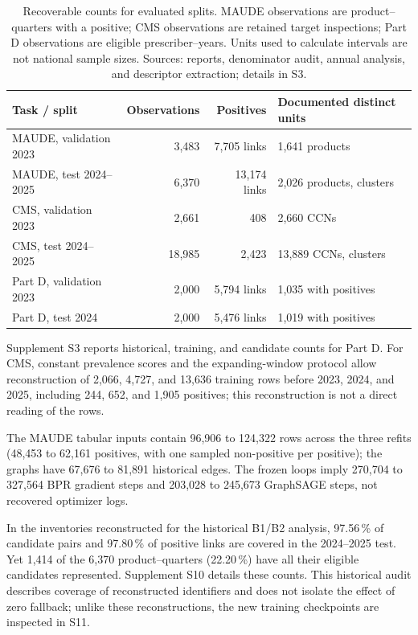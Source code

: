 \begin{table}[!htbp]
\centering\footnotesize
\caption{Recoverable counts for evaluated splits. MAUDE observations are product--quarters with a positive; CMS observations are retained target inspections; Part D observations are eligible prescriber--years. Units used to calculate intervals are not national sample sizes. Sources: reports, denominator audit, annual analysis, and descriptor extraction\cite{hgbresults,hgbanalysis,hgbpartd}; details in S3.}
\label{tab:population}
\begin{tabularx}{\linewidth}{@{}lrrX@{}}
\toprule
Task / split & Observations & Positives & Documented distinct units\\
\midrule
MAUDE, validation 2023 & 3,483 & 7,705 links & 1,641 products\\
MAUDE, test 2024--2025 & 6,370 & 13,174 links & 2,026 products, clusters\\
CMS, validation 2023 & 2,661 & 408 & 2,660 CCNs\\
CMS, test 2024--2025 & 18,985 & 2,423 & 13,889 CCNs, clusters\\
Part D, validation 2023 & 2,000 & 5,794 links & 1,035 with positives\\
Part D, test 2024 & 2,000 & 5,476 links & 1,019 with positives\\
\bottomrule
\end{tabularx}
\end{table}

Supplement S3 reports historical, training, and candidate counts for Part D. For CMS, constant prevalence scores and the expanding-window protocol allow reconstruction of 2,066, 4,727, and 13,636 training rows before 2023, 2024, and 2025, including 244, 652, and 1,905 positives; this reconstruction is not a direct reading of the rows.

The MAUDE tabular inputs contain 96,906 to 124,322 rows across the three refits (48,453 to 62,161 positives, with one sampled non-positive per positive); the graphs have 67,676 to 81,891 historical edges. The frozen loops imply 270,704 to 327,564 BPR gradient steps and 203,028 to 245,673 GraphSAGE steps, not recovered optimizer logs.

In the inventories reconstructed for the historical B1/B2 analysis, 97.56\,\% of candidate pairs and 97.80\,\% of positive links are covered in the 2024--2025 test. Yet 1,414 of the 6,370 product--quarters (22.20\,\%) have all their eligible candidates represented. Supplement S10 details these counts. This historical audit describes coverage of reconstructed identifiers and does not isolate the effect of zero fallback; unlike these reconstructions, the new training checkpoints are inspected in S11.

